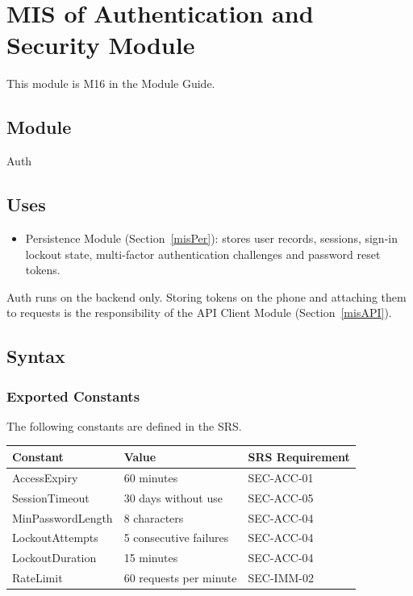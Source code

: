 \documentclass[12pt, titlepage]{article}
\begin{document}
\section{MIS of Authentication and Security Module} \label{misAuth}

This module is M16 in the Module Guide.

\subsection{Module}

Auth

\subsection{Uses}

\begin{itemize}
\item Persistence Module (Section~\ref{misPer}): stores user records, sessions,
  sign-in lockout state, multi-factor authentication challenges and password
  reset tokens.
\end{itemize}

\noindent Auth runs on the backend only. Storing tokens on the phone and
attaching them to requests is the responsibility of the API Client Module
(Section~\ref{misAPI}).

\subsection{Syntax}

\subsubsection{Exported Constants}

The following constants are defined in the SRS.

\begin{center}
\renewcommand{\arraystretch}{1.2}
\begin{tabular}{l l l}
\toprule
\textbf{Constant} & \textbf{Value} & \textbf{SRS Requirement}\\
\midrule
\textsf{AccessExpiry} & 60 minutes & SEC-ACC-01\\
\textsf{SessionTimeout} & 30 days without use & SEC-ACC-05\\
\textsf{MinPasswordLength} & 8 characters & SEC-ACC-04\\
\textsf{LockoutAttempts} & 5 consecutive failures & SEC-ACC-04\\
\textsf{LockoutDuration} & 15 minutes & SEC-ACC-04\\
\textsf{RateLimit} & 60 requests per minute & SEC-IMM-02\\
\bottomrule
\end{tabular}
\end{center}
\end{document}

